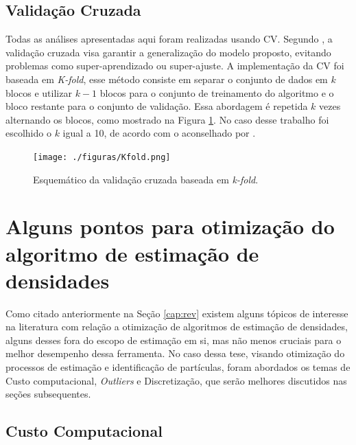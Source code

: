 \subsection{Validação Cruzada}

Todas as análises apresentadas aqui foram realizadas usando \ac{CV}. Segundo \cite{kohavi1995study}, a validação cruzada visa garantir a generalização do modelo proposto, evitando problemas como super-aprendizado ou super-ajuste. A implementação da \ac{CV} foi baseada em \textit{K-fold}, esse método consiste em separar o conjunto de dados em $k$ blocos e utilizar $k-1$ blocos para o conjunto de treinamento do algoritmo e o bloco restante para o conjunto de validação. Essa abordagem é repetida $k$ vezes alternando os blocos, como mostrado na Figura \ref{fig:09}. No caso desse trabalho foi escolhido o $k$ igual a 10, de acordo com o aconselhado por \cite{kohavi1995study}.

\begin{figure}[!ht]
	\begin{center}
		\texttt{[image: ./figuras/Kfold.png]}
		\caption{Esquemático da validação cruzada baseada em \textit{k-fold}.}\label{fig:09}
	\end{center}
\end{figure}

\section{Alguns pontos para otimização do algoritmo de estimação de densidades}

Como citado anteriormente na Seção \ref{cap:rev} existem alguns tópicos de interesse na literatura com relação a otimização de algoritmos de estimação de densidades, alguns desses fora do escopo de estimação em si, mas não menos cruciais para o melhor desempenho dessa ferramenta. No caso dessa tese, visando otimização do processos de estimação e identificação de partículas, foram abordados os temas de Custo computacional, \textit{Outliers} e Discretização, que serão melhores discutidos nas seções subsequentes.

\subsection{Custo Computacional}

